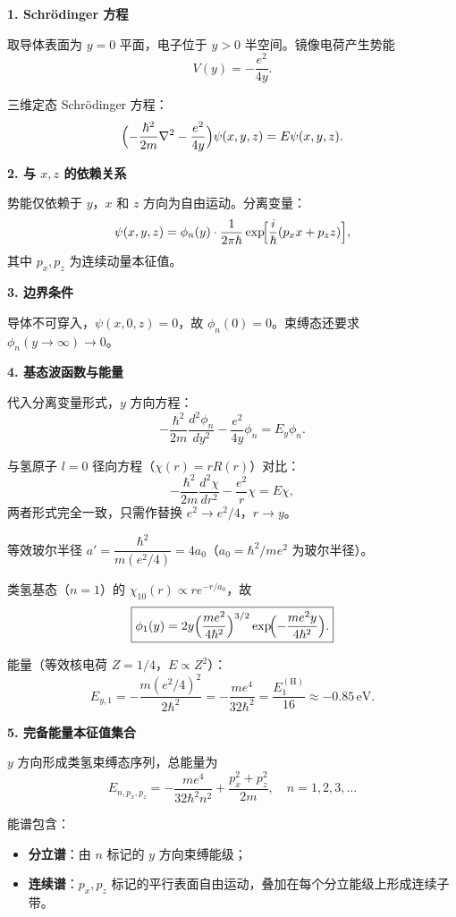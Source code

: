 \begin{derivationbox}[标准解题过程]
\textbf{1. Schrödinger 方程}

取导体表面为 $y=0$ 平面，电子位于 $y>0$ 半空间。镜像电荷产生势能
\[
V(y)=-\frac{e^2}{4y}.
\]

三维定态 Schrödinger 方程：
\begin{equation}
\Bigl(-\frac{\hbar^2}{2m}\nabla^2-\frac{e^2}{4y}\Bigr)\psi(x,y,z)=E\psi(x,y,z).
\end{equation}

\textbf{2. 与 $x,z$ 的依赖关系}

势能仅依赖于 $y$，$x$ 和 $z$ 方向为自由运动。分离变量：
\[
\psi(x,y,z)=\phi_n(y)\cdot\frac{1}{2\pi\hbar}\exp\!\Bigl[\frac{i}{\hbar}(p_xx+p_zz)\Bigr],
\]
其中 $p_x,p_z$ 为连续动量本征值。

\textbf{3. 边界条件}

导体不可穿入，$\psi(x,0,z)=0$，故 $\phi_n(0)=0$。束缚态还要求 $\phi_n(y\to\infty)\to0$。

\textbf{4. 基态波函数与能量}

代入分离变量形式，$y$ 方向方程：
\[
-\frac{\hbar^2}{2m}\frac{d^2\phi_n}{dy^2}-\frac{e^2}{4y}\phi_n=E_y\phi_n.
\]

与氢原子 $l=0$ 径向方程（$\chi(r)=rR(r)$）对比：
\[
-\frac{\hbar^2}{2m}\frac{d^2\chi}{dr^2}-\frac{e^2}{r}\chi=E\chi,
\]
两者形式完全一致，只需作替换 $e^2\to e^2/4$，$r\to y$。

等效玻尔半径 $a'=\dfrac{\hbar^2}{m(e^2/4)}=4a_0$（$a_0=\hbar^2/me^2$ 为玻尔半径）。

类氢基态（$n=1$）的 $\chi_{10}(r)\propto re^{-r/a_0}$，故
\begin{equation}
\boxed{\phi_1(y)=2y\Bigl(\frac{me^2}{4\hbar^2}\Bigr)^{3/2}\exp\!\Bigl(-\frac{me^2y}{4\hbar^2}\Bigr).}
\end{equation}

能量（等效核电荷 $Z=1/4$，$E\propto Z^2$）：
\begin{equation}
\boxed{E_{y,1}=-\frac{m(e^2/4)^2}{2\hbar^2}=-\frac{me^4}{32\hbar^2}=\frac{E_1^{(\text{H})}}{16}\approx-0.85\,\text{eV}.}
\end{equation}

\textbf{5. 完备能量本征值集合}

$y$ 方向形成类氢束缚态序列，总能量为
\begin{equation}
\boxed{E_{n,p_x,p_z}=-\frac{me^4}{32\hbar^2n^2}+\frac{p_x^2+p_z^2}{2m},\quad n=1,2,3,\ldots}
\end{equation}

能谱包含：
\begin{itemize}
    \item \textbf{分立谱}：由 $n$ 标记的 $y$ 方向束缚能级；
    \item \textbf{连续谱}：$p_x,p_z$ 标记的平行表面自由运动，叠加在每个分立能级上形成连续子带。
\end{itemize}
\end{derivationbox}

